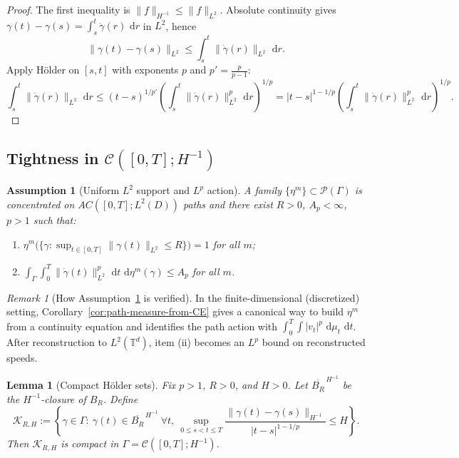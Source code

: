 \documentclass{article}
\numberwithin{equation}{section}
\theoremstyle{plain}
\newtheorem{lemma}[theorem]{Lemma}
\newtheorem{assumption}[theorem]{Assumption}
\theoremstyle{definition}
\theoremstyle{remark}
\newtheorem{remark}[theorem]{Remark}
\newcommand{\T}{\mathbb{T}}
\newcommand{\Pcal}{\mathcal{P}}
\newcommand{\Ccal}{\mathcal{C}}
\newcommand{\dd}{\,\mathrm{d}}
\newcommand{\Kcal}{\mathcal{K}}
\begin{document}
\begin{proof}
The first inequality is $\|f\|_{H^{-1}}\le\|f\|_{L^2}$.
Absolute continuity gives $\gamma(t)-\gamma(s)=\int_s^t \dot\gamma(r)\,\dd r$ in $L^2$, hence
\[
\|\gamma(t)-\gamma(s)\|_{L^2}\le \int_s^t \|\dot\gamma(r)\|_{L^2}\,\dd r.
\]
Apply H\"older on $[s,t]$ with exponents $p$ and $p'=\frac{p}{p-1}$:
\[
\int_s^t \|\dot\gamma(r)\|_{L^2}\,\dd r
\le (t-s)^{1/p'}\left(\int_s^t \|\dot\gamma(r)\|_{L^2}^p\,\dd r\right)^{1/p}
= |t-s|^{1-1/p}\left(\int_s^t \|\dot\gamma(r)\|_{L^2}^p\,\dd r\right)^{1/p}.
\]
\end{proof}

\subsection{Tightness in $\Ccal([0,T];H^{-1})$}

\begin{assumption}[Uniform $L^2$ support and $L^p$ action]\label{ass:uniform-action}
A family $\{\eta^m\}\subset \Pcal(\Gamma)$ is concentrated on $AC([0,T];L^2(D))$ paths and there exist $R>0$, $A_p<\infty$, $p>1$ such that:
\begin{enumerate}[label=(\roman*),leftmargin=2.2em]
\item $\eta^m\big(\{\gamma:\sup_{t\in[0,T]}\|\gamma(t)\|_{L^2}\le R\}\big)=1$ for all $m$;
\item $\displaystyle \int_\Gamma\int_0^T\|\dot\gamma(t)\|_{L^2}^p\,\dd t\,\dd\eta^m(\gamma)\le A_p$ for all $m$.
\end{enumerate}
\end{assumption}

\begin{remark}[How Assumption~\ref{ass:uniform-action} is verified]
In the finite-dimensional (discretized) setting, Corollary~\ref{cor:path-measure-from-CE} gives a canonical way to build
$\eta^m$ from a continuity equation and identifies the path action with $\int_0^T\!\int |v_t|^p\,\dd\mu_t\,\dd t$.
After reconstruction to $L^2(\T^d)$, item (ii) becomes an $L^p$ bound on reconstructed speeds.
\end{remark}

\begin{lemma}[Compact H\"older sets]\label{lem:compact-holder-set}
Fix $p>1$, $R>0$, and $H>0$. Let $\overline{B_R}^{\,H^{-1}}$ be the $H^{-1}$-closure of $B_R$.
Define
\[
\Kcal_{R,H}:=\left\{\gamma\in\Gamma:\ \gamma(t)\in\overline{B_R}^{\,H^{-1}}\ \forall t,\ 
\sup_{0\le s<t\le T}\frac{\|\gamma(t)-\gamma(s)\|_{H^{-1}}}{|t-s|^{1-1/p}}\le H\right\}.
\]
Then $\Kcal_{R,H}$ is compact in $\Gamma=\Ccal([0,T];H^{-1})$.
\end{lemma}
\end{document}
